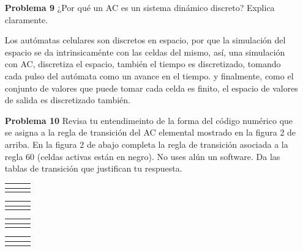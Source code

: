 \documentclass{article}
\begin{document}
\begin{enumerate}
\item[\bf{Problema 9}]¿Por qué un AC es un sistema dinámico discreto? Explica claramente.

Los autómatas celulares son discretos en espacio, por que la simulación del espacio se da intrinsicaménte con las celdas del mismo, así, una simulación con AC, discretiza el espacio, también el tiempo es discretizado, tomando cada pulso del autómata como un avance en el tiempo. y finalmente, como el conjunto de valores que puede tomar cada celda es finito, el espacio de valores de salida es discretizado también.


\item[\bf{Problema 10}] Revisa tu entendimeinto de la forma del código numérico que se asigna a la regla de transición del AC elemental mostrado en la figura 2 de arriba. En la figura 2 de abajo completa la regla de transición asociada a la regla 60 (celdas activas están en negro). No uses alún un software. Da las tablas de transición que justifican tu respuesta.

\begin{tabular}{c|c|c} %
  \hline
 \multicolumn{1}{|c|}{\cellcolor{gray}}&\cellcolor{gray}&\multicolumn{1}{c|}{\cellcolor{gray}}\\
  \hline
 & & \\
\cline{2-2}
\end{tabular}
\quad 
\begin{tabular}{c|c|c} %
  \hline
 \multicolumn{1}{|c|}{\cellcolor{gray}}&\cellcolor{gray}& \multicolumn{1}{c|}{}\\
  \hline
 &  & \\
\cline{2-2}
\end{tabular}
\quad 
\begin{tabular}{c|c|c}%
  \hline
 \multicolumn{1}{|c|}{\cellcolor{gray}}& & \multicolumn{1}{c|}{\cellcolor{gray}}\\
  \hline
 &  & \\
\cline{2-2}
\end{tabular}
\quad
\begin{tabular}{c|c|c} %
  \hline
 \multicolumn{1}{|c|}{\cellcolor{gray}}& & \multicolumn{1}{c|}{ }  \\
  \hline
 & & \\
\cline{2-2}
\end{tabular}\\


\end{enumerate}
\end{document}
